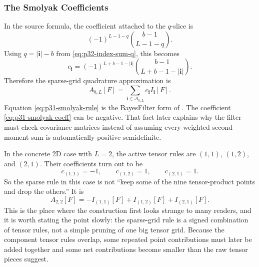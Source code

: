 \documentclass[11pt]{article}
\numberwithin{equation}{section}
\begin{document}
\subsubsection{The Smolyak Coefficients}
\label{subsec:p32-smolyak-coefficients}

In the source formula, the coefficient attached to the \(q\)-slice is
\[
  (-1)^{L-1-q}\binom{b-1}{L-1-q}.
\]
Using \(q=|\mathbf i|-b\) from \eqref{eq:p32-index-sum-q}, this becomes
\begin{equation}
  c_{\mathbf i}
  =
  (-1)^{L+b-1-|\mathbf i|}
  \binom{b-1}{L+b-1-|\mathbf i|}.
  \label{eq:p31-smolyak-coeff}
\end{equation}
Therefore the sparse-grid quadrature approximation is
\begin{equation}
  A_{b,L}[F]
  =
  \sum_{\mathbf i\in\mathcal A_{b,L}}
  c_{\mathbf i}I_{\mathbf i}[F].
  \label{eq:p31-smolyak-rule}
\end{equation}
Equation \eqref{eq:p31-smolyak-rule} is the BayesFilter form of
\citet[Eq. 26--29]{jia2012sparsegrid}.  The coefficient
\eqref{eq:p31-smolyak-coeff} can be negative.  That fact later explains why
the filter must check covariance matrices instead of assuming every weighted
second-moment sum is automatically positive semidefinite.

In the concrete 2D case with \(L=2\), the active tensor rules are
\((1,1)\), \((1,2)\), and \((2,1)\).  Their coefficients turn out to be
\begin{equation}
  c_{(1,1)}=-1,
  \qquad
  c_{(1,2)}=1,
  \qquad
  c_{(2,1)}=1.
  \label{eq:p36-2d-smolyak-coeffs}
\end{equation}
So the sparse rule in this case is not ``keep some of the nine tensor-product
points and drop the others.''  It is
\begin{equation}
  A_{2,2}[F] = -I_{(1,1)}[F] + I_{(1,2)}[F] + I_{(2,1)}[F].
  \label{eq:p36-2d-smolyak-rule}
\end{equation}
This is the place where the construction first looks strange to many readers,
and it is worth stating the point slowly: the sparse-grid rule is a signed
combination of tensor rules, not a simple pruning of one big tensor grid.
Because the component tensor rules overlap, some repeated point contributions
must later be added together and some net contributions become smaller than the
raw tensor pieces suggest.
\end{document}
